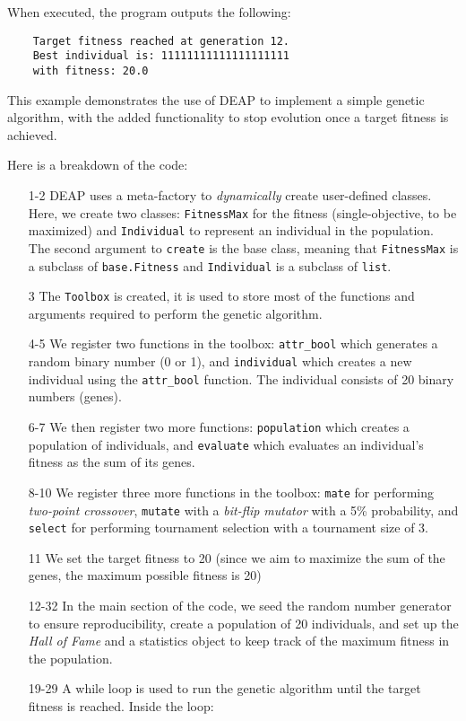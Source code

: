  When executed, the program outputs the following:

  \begin{verbatim}
    Target fitness reached at generation 12.
    Best individual is: 11111111111111111111
    with fitness: 20.0
  \end{verbatim}

  This example demonstrates the use of DEAP to implement a simple genetic
  algorithm, with the added functionality to stop evolution once a target
  fitness is achieved.

  Here is a breakdown of the code:

  \begin{enumerate}
    \item[1-2] DEAP uses a meta-factory to \textit{dynamically} create
      user-defined classes.
      Here, we create two classes: \texttt{FitnessMax} for the fitness
      (single-objective, to be maximized) and \texttt{Individual} to represent
      an individual in the population.
      The second argument to \texttt{create} is the base class, meaning that
      \texttt{FitnessMax} is a subclass of \texttt{base.Fitness} and
      \texttt{Individual} is a subclass of \texttt{list}.
    \item[3] The \texttt{Toolbox} is created, it is used to store most of the
      functions and arguments required to perform the genetic algorithm.
    \item[4-5] We register two functions in the toolbox: \texttt{attr\_bool} 
      which generates a random binary number (0 or 1), and \texttt{individual}
      which creates a new individual using the \texttt{attr\_bool} function.
      The individual consists of 20 binary numbers (genes).
    \item[6-7] We then register two more functions: \texttt{population} which
      creates a population of individuals, and \texttt{evaluate} which evaluates
      an individual's fitness as the sum of its genes.
    \item[8-10] We register three more functions in the toolbox: \texttt{mate}
      for performing \textit{two-point crossover}, \texttt{mutate} with a
      \textit{bit-flip mutator} with a 5\% probability, and \texttt{select}
      for performing tournament selection with a tournament size of 3.
    \item[11] We set the target fitness to 20 (since we aim to maximize the sum
      of the genes, the maximum possible fitness is 20) 
    \item[12-32] In the main section of the code, we seed the random number
      generator to ensure reproducibility, create a population of 20
      individuals, and set up the \textit{Hall of Fame} and a statistics object
      to keep track of the maximum fitness in the population.
    \item[19-29] A while loop is used to run the genetic algorithm until the
      target fitness is reached.
      Inside the loop:


\end{enumerate}
